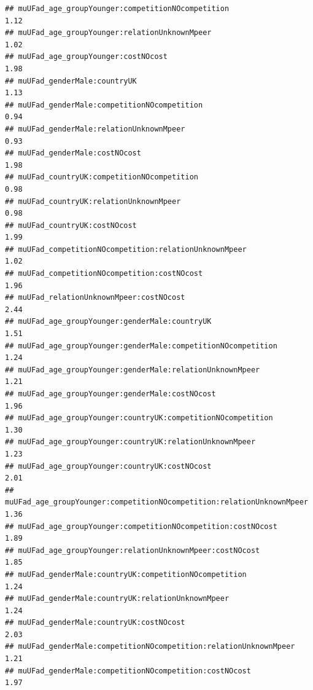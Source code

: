 \documentclass[
]{article}
\begin{document}
\begin{verbatim}
## muUFad_age_groupYounger:competitionNOcompetition                                       1.12
## muUFad_age_groupYounger:relationUnknownMpeer                                           1.02
## muUFad_age_groupYounger:costNOcost                                                     1.98
## muUFad_genderMale:countryUK                                                            1.13
## muUFad_genderMale:competitionNOcompetition                                             0.94
## muUFad_genderMale:relationUnknownMpeer                                                 0.93
## muUFad_genderMale:costNOcost                                                           1.98
## muUFad_countryUK:competitionNOcompetition                                              0.98
## muUFad_countryUK:relationUnknownMpeer                                                  0.98
## muUFad_countryUK:costNOcost                                                            1.99
## muUFad_competitionNOcompetition:relationUnknownMpeer                                   1.02
## muUFad_competitionNOcompetition:costNOcost                                             1.96
## muUFad_relationUnknownMpeer:costNOcost                                                 2.44
## muUFad_age_groupYounger:genderMale:countryUK                                           1.51
## muUFad_age_groupYounger:genderMale:competitionNOcompetition                            1.24
## muUFad_age_groupYounger:genderMale:relationUnknownMpeer                                1.21
## muUFad_age_groupYounger:genderMale:costNOcost                                          1.96
## muUFad_age_groupYounger:countryUK:competitionNOcompetition                             1.30
## muUFad_age_groupYounger:countryUK:relationUnknownMpeer                                 1.23
## muUFad_age_groupYounger:countryUK:costNOcost                                           2.01
## muUFad_age_groupYounger:competitionNOcompetition:relationUnknownMpeer                  1.36
## muUFad_age_groupYounger:competitionNOcompetition:costNOcost                            1.89
## muUFad_age_groupYounger:relationUnknownMpeer:costNOcost                                1.85
## muUFad_genderMale:countryUK:competitionNOcompetition                                   1.24
## muUFad_genderMale:countryUK:relationUnknownMpeer                                       1.24
## muUFad_genderMale:countryUK:costNOcost                                                 2.03
## muUFad_genderMale:competitionNOcompetition:relationUnknownMpeer                        1.21
## muUFad_genderMale:competitionNOcompetition:costNOcost                                  1.97

\end{verbatim}
\end{document}
